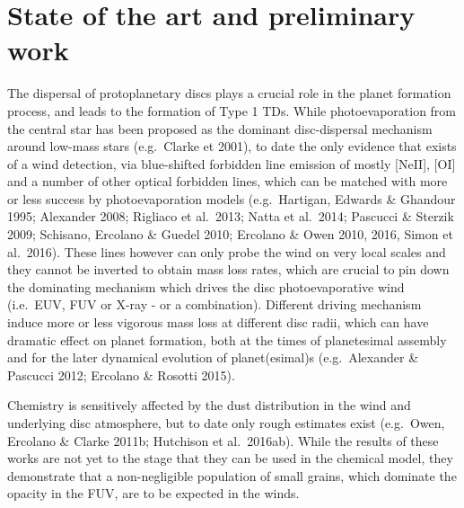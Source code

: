 \documentclass[10pt,fleqn,twoside]{article}
\begin{document}
\section{State of the art and preliminary work}
\renewcommand{\leftmark}{\sc State of the Art and preliminary work}

The dispersal of protoplanetary discs plays a crucial role in the
planet formation process, and leads to the formation of Type
1 TDs. While photoevaporation from the central star has been proposed
as the dominant disc-dispersal mechanism around low-mass stars
(e.g.\ Clarke et 2001), to date the only evidence that exists of a
wind detection, via blue-shifted forbidden line emission of mostly
[NeII], [OI] and a number of other optical forbidden lines, which can
be matched with more or less success by photoevaporation models
(e.g.\ Hartigan, Edwards \& Ghandour 1995; Alexander 2008; 
Rigliaco et al.\ 2013; Natta et al.\ 2014; Pascucci \& Sterzik 2009; Schisano, Ercolano \& Guedel 2010; Ercolano
\& Owen 2010, 2016, Simon et al.\ 2016). These lines however  can only probe the wind on very local
scales and they cannot be inverted to obtain mass loss rates, which
are crucial to pin down the dominating mechanism which drives the disc
photoevaporative wind
(i.e.\ EUV, FUV or X-ray - or a combination). Different driving
mechanism induce more or less vigorous mass loss at different disc
radii, which  can have dramatic effect on planet formation, both at
the times of planetesimal assembly and for the later dynamical
evolution of planet(esimal)s (e.g.\ Alexander \& Pascucci 2012;
Ercolano \& Rosotti 2015).   

 Chemistry is
sensitively affected by the dust distribution in the wind and
underlying disc atmosphere, but to date only rough estimates exist
(e.g.\ Owen, Ercolano \& Clarke 2011b; Hutchison et al.\ 2016ab). While
the results of these works are not yet to the stage that they can 
be used in the chemical model, they demonstrate
that a non-negligible population of small grains, which dominate the
opacity in the FUV, are to be expected in the winds. 
\end{document}
